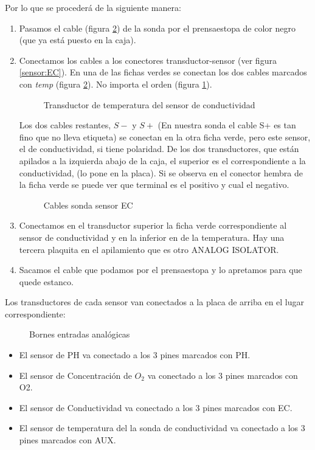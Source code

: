 \begin{itemize}
Por lo que se procederá de la siguiente manera:
\begin{enumerate}
\item Pasamos el cable (figura \ref{sensor:CEC}) de la sonda por el prensaestopa de color negro (que ya está puesto en la caja).
\item Conectamos los cables a los conectores transductor-sensor (ver figura \ref{sensor:EC}). En una de las fichas verdes se conectan los dos cables marcados con \emph{temp} (figura \ref{sensor:CEC}). No importa el orden (figura \ref{sensor:temp}).\\ 
\begin{figure}[htbp!] 
\caption{Transductor de temperatura del sensor de conductividad}\label{sensor:temp} 
\end{figure}
Los dos cables restantes, $S-$ y $S+$ (En nuestra sonda el cable S+ es tan fino que no lleva etiqueta) se conectan en la otra ficha verde, pero este sensor, el de conductividad, si tiene polaridad. De los dos transductores, que están apilados a la izquierda abajo de la caja, el superior es el correspondiente a la conductividad, (lo pone en la placa). Si se observa en el conector hembra de la ficha verde se puede ver que terminal es el positivo y cual el negativo. 
\begin{figure}[htbp!] 
\caption{Cables sonda sensor EC}\label{sensor:CEC} 
\end{figure}
\item Conectamos en el transductor superior la ficha verde correspondiente al sensor de conductividad y en la inferior en de la temperatura. Hay una tercera plaquita en el apilamiento que es otro ANALOG ISOLATOR.
\item Sacamos el cable que podamos por el prensaestopa y lo apretamos para que quede estanco.
\end{enumerate}

\end{itemize}

Los transductores de cada sensor van conectados a la placa de arriba en el lugar correspondiente:
\begin{figure}[htbp!] 
\caption{Bornes entradas analógicas}\label{sensor:Anal} 
\end{figure}
\begin{itemize}
\item El sensor de PH va conectado a los 3 pines marcados con PH. 
\item El sensor de Concentración de $O_2$ va conectado a los 3 pines marcados con O2. 
\item El sensor de Conductividad va conectado a los 3 pines marcados con EC.
\item El sensor de temperatura del la sonda de conductividad va conectado a los 3 pines marcados con AUX.
\end{itemize}

